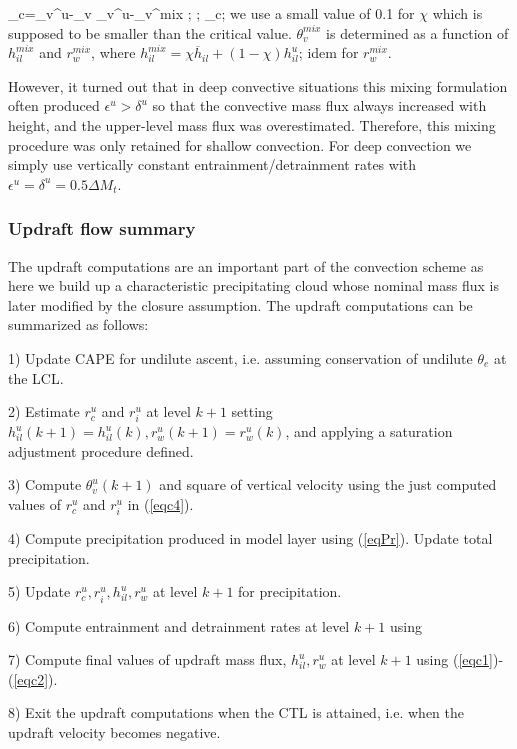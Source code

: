 \beq
\chi_c={\theta_v^u-\overline{\theta}_v\over
         {\theta}_v^u-\theta_v^{mix} }   \chi; \quad {};
         \le\chi_c;
\label{eqx5}
\eeq
\noindent
we use a small value of 0.1 for $\chi$ which is
supposed to be smaller than the critical value. $\theta_v^{mix}$ is
determined as a function of $h_{il}^{mix}$ and $r_w^{mix}$, where
$h_{il}^{mix}=\chi \overline{h}_{il}+(1-\chi)h_{il}^u$; idem for $r_w^{mix}$.

However, it turned out that in deep convective situations this mixing formulation often 
 produced $\epsilon^u>\delta^u$ so that the convective mass flux always increased with height,
and the upper-level mass flux was overestimated.
 Therefore, this mixing procedure was only retained for shallow convection. For deep convection
we simply use vertically constant entrainment/detrainment rates with 
 $\epsilon^u=\delta^u=0.5 \Delta M_t$.



\subsubsection{Updraft flow summary}

The updraft computations are an important
part of the convection scheme as here we build up a characteristic
precipitating cloud whose nominal mass flux is later modified
by the closure assumption. The
updraft computations can be summarized as follows:

1) Update CAPE for undilute ascent, i.e. assuming conservation of undilute
 $\theta_e$  at the LCL.

2) Estimate $r_c^u$ and $r_i^u$ at level $k+1$ setting
$h_{il}^u(k+1)=h_{il}^u(k), r_w^u(k+1)=r_w^u(k)$, and applying a
saturation adjustment procedure defined.

3) Compute $\theta_v^u(k+1)$ and square of vertical velocity using the
just computed values of $r_c^u$ and $r_i^u$ in (\ref{eqc4}).

4) Compute precipitation produced in model layer using (\ref{eqPr}).
Update total precipitation.

5) Update $r_c^u, r_i^u, h_{il}^u, r_w^u$ at level $k+1$
for precipitation.

6) Compute entrainment and detrainment rates at level $k+1$ using

7) Compute final values of updraft mass flux, $h_{il}^u, r_w^u$
at level $k+1$ using (\ref{eqc1})-(\ref{eqc2}).

8) Exit the updraft computations when the CTL is attained, i.e. when
the updraft velocity becomes negative.

